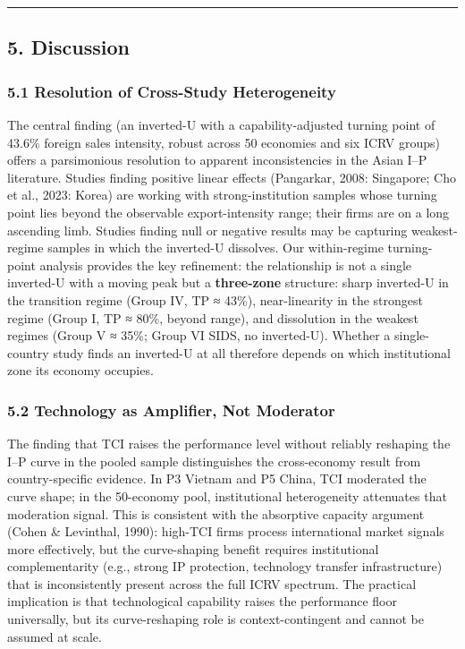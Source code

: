 \documentclass[
  12pt,a4paper]{article}
\begin{document}
\begin{center}\rule{0.5\linewidth}{0.5pt}\end{center}

\hypertarget{discussion}{%
\subsection{5. Discussion}\label{discussion}}

\hypertarget{resolution-of-cross-study-heterogeneity}{%
\subsubsection{5.1 Resolution of Cross-Study
Heterogeneity}\label{resolution-of-cross-study-heterogeneity}}

The central finding (an inverted-U with a capability-adjusted turning
point of 43.6\% foreign sales intensity, robust across 50 economies and
six ICRV groups) offers a parsimonious resolution to apparent
inconsistencies in the Asian I--P literature. Studies finding positive
linear effects (Pangarkar, 2008: Singapore; Cho et al., 2023: Korea) are
working with strong-institution samples whose turning point lies beyond
the observable export-intensity range; their firms are on a long
ascending limb. Studies finding null or negative results may be
capturing weakest-regime samples in which the inverted-U dissolves. Our
within-regime turning-point analysis provides the key refinement: the
relationship is not a single inverted-U with a moving peak but a
\textbf{three-zone} structure: sharp inverted-U in the transition regime
(Group IV, TP ≈ 43\%), near-linearity in the strongest regime (Group I,
TP ≈ 80\%, beyond range), and dissolution in the weakest regimes (Group
V ≈ 35\%; Group VI SIDS, no inverted-U). Whether a single-country study
finds an inverted-U at all therefore depends on which institutional zone
its economy occupies.

\hypertarget{technology-as-amplifier-not-moderator}{%
\subsubsection{5.2 Technology as Amplifier, Not
Moderator}\label{technology-as-amplifier-not-moderator}}

The finding that TCI raises the performance level without reliably
reshaping the I--P curve in the pooled sample distinguishes the
cross-economy result from country-specific evidence. In P3 Vietnam and
P5 China, TCI moderated the curve shape; in the 50-economy pool,
institutional heterogeneity attenuates that moderation signal. This is
consistent with the absorptive capacity argument (Cohen \& Levinthal,
1990): high-TCI firms process international market signals more
effectively, but the curve-shaping benefit requires institutional
complementarity (e.g., strong IP protection, technology transfer
infrastructure) that is inconsistently present across the full ICRV
spectrum. The practical implication is that technological capability
raises the performance floor universally, but its curve-reshaping role
is context-contingent and cannot be assumed at scale.
\end{document}
